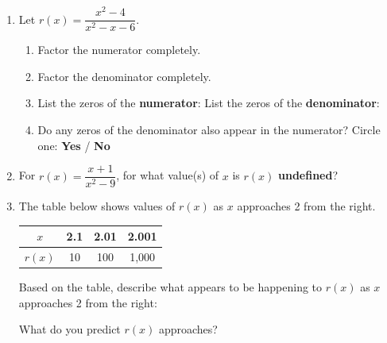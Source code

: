 \documentclass[10pt]{article}
\begin{document}
\namedateperiod

\vspace{0.14in}

\begin{enumerate}[itemsep=14pt]

\item Let $r(x) = \dfrac{x^2 - 4}{x^2 - x - 6}$.

\begin{enumerate}[label=(\alph*), itemsep=6pt]
  \item Factor the numerator completely. \quad \blank{6cm}

  \item Factor the denominator completely. \quad \blank{6cm}

  \item List the zeros of the \textbf{numerator}: \blank{3cm} \quad
        List the zeros of the \textbf{denominator}: \blank{3cm}

  \item Do any zeros of the denominator also appear in the numerator? Circle one:
        \quad \textbf{Yes} \quad / \quad \textbf{No}
\end{enumerate}

\item For $r(x) = \dfrac{x + 1}{x^2 - 9}$, for what value(s) of $x$ is $r(x)$ \textbf{undefined}?

\vspace{0.1in}
\blank{7cm}

\item The table below shows values of $r(x)$ as $x$ approaches 2 from the right.

\smallskip
\renewcommand{\arraystretch}{1.3}
\begin{tabular}{|c|c|c|c|}
\hline
$x$    & 2.1 & 2.01 & 2.001 \\
\hline
$r(x)$ & 10  & 100  & 1{,}000 \\
\hline
\end{tabular}
\smallskip

Based on the table, describe what appears to be happening to $r(x)$ as $x$ approaches 2
from the right:

\vspace{0.12in}
\writeline

\vspace{0.1in}
What do you predict $r(x)$ approaches? \blank{5cm}

\end{enumerate}
\end{document}
